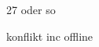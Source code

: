 \documentclass[paper=a4,13pt,ngerman]{scrartcl}
\begin{document}
27 oder so 


konflikt inc offline
\end{document}
